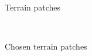 \documentclass[11pt, a4paper]{article}
\begin{document}
\begin{figure}
  \caption{Terrain patches}%
  \label{fig:terrain_patches}%
\end{figure}
\begin{figure}
  \centering
  \\
  \caption{Chosen terrain patches}%
  \label{fig:terrain_patches_focus}%
\end{figure}
\end{document}
